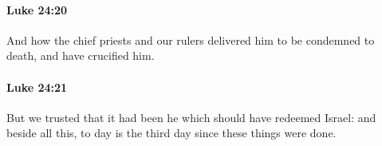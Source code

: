 		\paragraph{Luke 24:20} %
			\label{LUKE-24-20}

			And how the chief priests and our rulers delivered him to be condemned to death, and have crucified him.

			\begin{framed}
			\scriptsize
				\begin{compactdesc}
					\item[SBLG] 
				\end{compactdesc}
			\end{framed}

		\paragraph{Luke 24:21} %
			\label{LUKE-24-21}

			But we trusted that it had been he which should have redeemed Israel: and beside all this, to day is the third day since these things were done.

